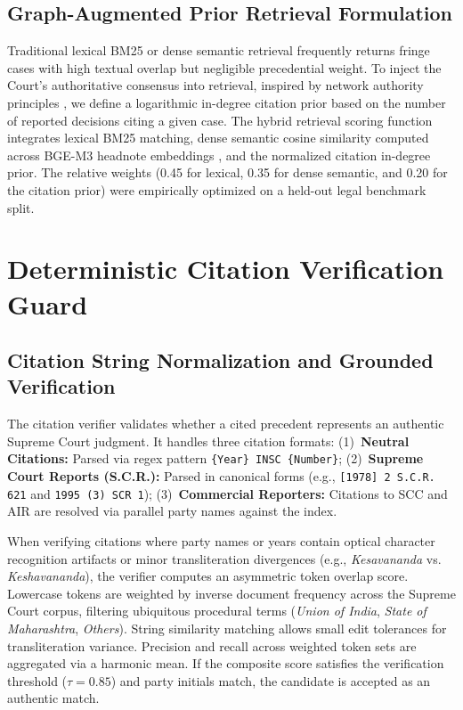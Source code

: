 \documentclass[conference]{IEEEtran}
\begin{document}
\subsection{Graph-Augmented Prior Retrieval Formulation}
\label{sec:retrieval}
Traditional lexical BM25 or dense semantic retrieval frequently returns fringe cases with high textual overlap but negligible precedential weight. To inject the Court's authoritative consensus into retrieval, inspired by network authority principles \cite{fowler2007,page1999}, we define a logarithmic in-degree citation prior based on the number of reported decisions citing a given case. The hybrid retrieval scoring function integrates lexical BM25 matching, dense semantic cosine similarity computed across BGE-M3 headnote embeddings \cite{chen2024m3}, and the normalized citation in-degree prior. The relative weights (0.45 for lexical, 0.35 for dense semantic, and 0.20 for the citation prior) were empirically optimized on a held-out legal benchmark split.

\section{Deterministic Citation Verification Guard}
\label{sec:verifier}
\subsection{Citation String Normalization and Grounded Verification}
The citation verifier validates whether a cited precedent represents an authentic Supreme Court judgment. It handles three citation formats:
(1)~\textbf{Neutral Citations:} Parsed via regex pattern \texttt{\{Year\} INSC \{Number\}};
(2)~\textbf{Supreme Court Reports (S.C.R.):} Parsed in canonical forms (e.g., \texttt{[1978] 2 S.C.R. 621} and \texttt{1995 (3) SCR 1});
(3)~\textbf{Commercial Reporters:} Citations to SCC and AIR are resolved via parallel party names against the index.

When verifying citations where party names or years contain optical character recognition artifacts or minor transliteration divergences (e.g., \emph{Kesavananda} vs. \emph{Keshavananda}), the verifier computes an asymmetric token overlap score. Lowercase tokens are weighted by inverse document frequency across the Supreme Court corpus, filtering ubiquitous procedural terms (\emph{Union of India}, \emph{State of Maharashtra}, \emph{Others}). String similarity matching allows small edit tolerances for transliteration variance. Precision and recall across weighted token sets are aggregated via a harmonic mean. If the composite score satisfies the verification threshold ($\tau = 0.85$) and party initials match, the candidate is accepted as an authentic match.
\end{document}
